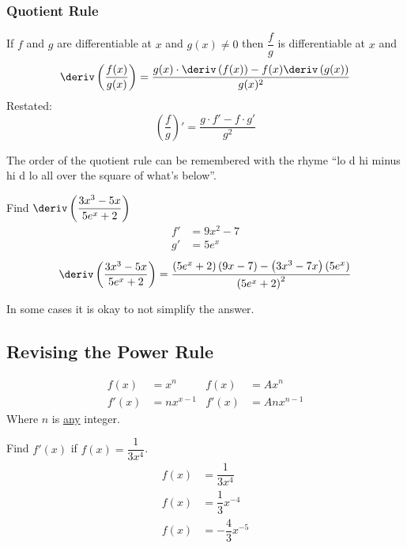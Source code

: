 \subsubsection{Quotient Rule}
\begin{theorem}
    If $f$ and $g$ are differentiable at $x$ and $g(x) \neq 0$ then $\dfrac{f}{g}$ is differentiable at $x$ and
    \begin{equation}
        \deriv\left(\dfrac{f(x)}{g(x)}\right) = \dfrac{g(x) \cdot \deriv\left(f(x)\right) - f(x) \deriv\left(g(x)\right)}{g(x)^2}
    \end{equation}
    Restated:
    \begin{equation}
        \left(\dfrac{f}{g}\right)' = \dfrac{g \cdot f' - f \cdot g'}{g^2}
    \end{equation}
\end{theorem}
\begin{remark}
    The order of the quotient rule can be remembered with the rhyme ``lo d hi minus hi d lo all over the square of what's below''.
\end{remark}
\begin{example}
    Find $\deriv\left(\dfrac{3x^3 - 5x}{5e^x + 2}\right)$
    \begin{align*}
        f' &= 9x^2-7 \\
        g' &= 5e^x
    \end{align*}
    \begin{equation*}
        \deriv\left(\dfrac{3x^3 - 5x}{5e^x+2}\right) = \dfrac{\left(5e^x + 2\right) \left(9x-7\right) - \left(3x^3 - 7x\right)\left(5e^x\right)}{\left(5e^x + 2\right)^2}
    \end{equation*}
\end{example}
\begin{remark}
    In some cases it is okay to not simplify the answer.
\end{remark}
\subsection{Revising the Power Rule}
\begin{align*}
    f(x)  &= x^n       & f(x)  &= Ax^n \\
    f'(x) &= nx^{x- 1} & f'(x) &= Anx^{n-1}
\end{align*}
Where $n$ is \underline{any} integer.
\begin{example}
    Find $f'(x)$ if $f(x) = \dfrac{1}{3x^4}$.
    \begin{align*}
        f(x) &= \dfrac{1}{3x^4} \\
        f(x) &= \dfrac{1}{3} x^{-4} \\
        f(x) &= -\dfrac{4}{3} x^{-5}
    \end{align*}
\end{example}
